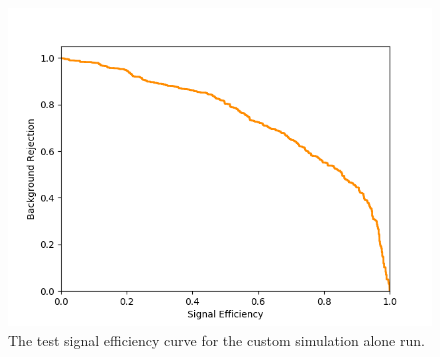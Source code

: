 \begin{figure}[] 
        \centering \includegraphics[width=\columnwidth]{figures/crabrun2_sigeff.png}

        \caption{
                \label{fig:cr2_sigeff} The test signal efficiency curve for the custom simulation alone run.
        }
\end{figure}


